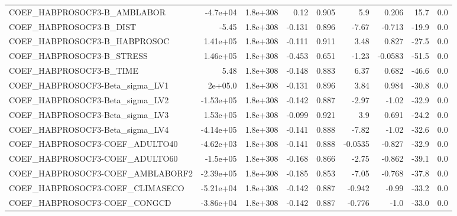 \begin{tabular}{lrrrrrrrr}
COEF\_HABPROSOCF3-B\_AMBLABOR       &    -4.7e+04 &     1.8e+308 &     0.12 &    0.905 &        5.9 &       0.206 &         15.7 &           0.0 \\
COEF\_HABPROSOCF3-B\_DIST           &       -5.45 &     1.8e+308 &   -0.131 &    0.896 &      -7.67 &      -0.713 &        -19.9 &           0.0 \\
COEF\_HABPROSOCF3-B\_HABPROSOC      &    1.41e+05 &     1.8e+308 &   -0.111 &    0.911 &       3.48 &       0.827 &        -27.5 &           0.0 \\
COEF\_HABPROSOCF3-B\_STRESS         &    1.46e+05 &     1.8e+308 &   -0.453 &    0.651 &      -1.23 &     -0.0583 &        -51.5 &           0.0 \\
COEF\_HABPROSOCF3-B\_TIME           &        5.48 &     1.8e+308 &   -0.148 &    0.883 &       6.37 &       0.682 &        -46.6 &           0.0 \\
COEF\_HABPROSOCF3-Beta\_sigma\_LV1   &     2e+05.0 &     1.8e+308 &   -0.131 &    0.896 &       3.84 &       0.984 &        -30.8 &           0.0 \\
COEF\_HABPROSOCF3-Beta\_sigma\_LV2   &   -1.53e+05 &     1.8e+308 &   -0.142 &    0.887 &      -2.97 &       -1.02 &        -32.9 &           0.0 \\
COEF\_HABPROSOCF3-Beta\_sigma\_LV3   &    1.53e+05 &     1.8e+308 &   -0.099 &    0.921 &        3.9 &       0.691 &        -24.2 &           0.0 \\
COEF\_HABPROSOCF3-Beta\_sigma\_LV4   &   -4.14e+05 &     1.8e+308 &   -0.141 &    0.888 &      -7.82 &       -1.02 &        -32.6 &           0.0 \\
COEF\_HABPROSOCF3-COEF\_ADULTO40    &   -4.62e+03 &     1.8e+308 &   -0.141 &    0.888 &    -0.0535 &      -0.827 &        -32.9 &           0.0 \\
COEF\_HABPROSOCF3-COEF\_ADULTO60    &    -1.5e+05 &     1.8e+308 &   -0.168 &    0.866 &      -2.75 &      -0.862 &        -39.1 &           0.0 \\
COEF\_HABPROSOCF3-COEF\_AMBLABORF2  &   -2.39e+05 &     1.8e+308 &   -0.185 &    0.853 &      -7.05 &      -0.768 &        -37.8 &           0.0 \\
COEF\_HABPROSOCF3-COEF\_CLIMASECO   &   -5.21e+04 &     1.8e+308 &   -0.142 &    0.887 &     -0.942 &       -0.99 &        -33.2 &           0.0 \\
COEF\_HABPROSOCF3-COEF\_CONGCD      &   -3.86e+04 &     1.8e+308 &   -0.142 &    0.887 &     -0.776 &        -1.0 &        -33.0 &           0.0 \\

\end{tabular}
